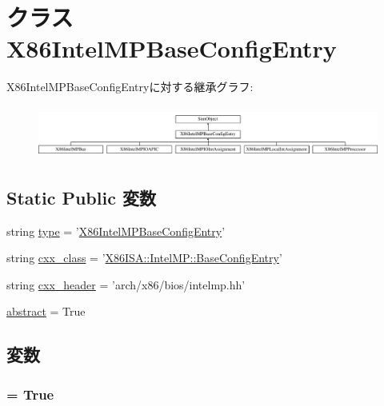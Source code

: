 \hypertarget{classIntelMP_1_1X86IntelMPBaseConfigEntry}{
\section{クラス X86IntelMPBaseConfigEntry}
\label{classIntelMP_1_1X86IntelMPBaseConfigEntry}
}
X86IntelMPBaseConfigEntryに対する継承グラフ:\begin{figure}[H]
\begin{center}
\leavevmode
\includegraphics[height=1.74093cm]{classIntelMP_1_1X86IntelMPBaseConfigEntry}
\end{center}
\end{figure}
\subsection*{Static Public 変数}
\begin{DoxyCompactItemize}
\item 
string \hyperlink{classIntelMP_1_1X86IntelMPBaseConfigEntry_acce15679d830831b0bbe8ebc2a60b2ca}{type} = '\hyperlink{classIntelMP_1_1X86IntelMPBaseConfigEntry}{X86IntelMPBaseConfigEntry}'
\item 
string \hyperlink{classIntelMP_1_1X86IntelMPBaseConfigEntry_a58cd55cd4023648e138237cfc0822ae3}{cxx\_\-class} = '\hyperlink{classX86ISA_1_1IntelMP_1_1BaseConfigEntry}{X86ISA::IntelMP::BaseConfigEntry}'
\item 
string \hyperlink{classIntelMP_1_1X86IntelMPBaseConfigEntry_a17da7064bc5c518791f0c891eff05fda}{cxx\_\-header} = 'arch/x86/bios/intelmp.hh'
\item 
\hyperlink{classIntelMP_1_1X86IntelMPBaseConfigEntry_a17fa61ac3806b481cafee5593b55e5d0}{abstract} = True
\end{DoxyCompactItemize}


\subsection{変数}
\hypertarget{classIntelMP_1_1X86IntelMPBaseConfigEntry_a17fa61ac3806b481cafee5593b55e5d0}{
\subsubsection[{abstract}]{ = True}}
\label{classIntelMP_1_1X86IntelMPBaseConfigEntry_a17fa61ac3806b481cafee5593b55e5d0}


